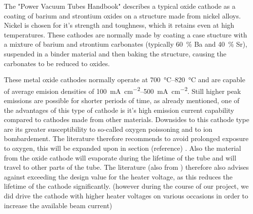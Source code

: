 The "Power Vacuum Tubes Handbook" \cite{PowerTubes323Avadhanulu} describes a typical oxide cathode as a coating of barium and strontium oxides on a structure made from nickel alloys. Nickel is chosen for it's strength and toughness, which it retains even at high temperatures. These cathodes are normally made by coating a case stucture with a mixture of barium and strontium carbonates (typically \SI{60}{\percent} Ba and \SI{40}{\percent} Sr), suspended in a binder material and then baking the structure, causing the carbonates to be reduced to oxides.

These metal oxide cathodes normally operate at \SIrange{700}{820}{\celsius} and are capable of average emision densities of \SIrange{100}{500}{\milli\ampere\per\centi\meter\squared}. Still higher peak emissions are possible for shorter periods of time, as already mentioned, one of the advantages of this type of cathode is it's high emission current capability compared to cathodes made from other materials. Downsides to this cathode type are its greater susceptibility to so-called oxygen poissoning and to ion bombardement. The literature therefore recommends to avoid prolonged exposure to oxygen, this will be expanded upon in section (reference) . Also the material from the oxide cathode will evaporate during the lifetime of the tube and will travel to other parts of the tube. The literature (also from \cite{PowerTubes323Avadhanulu}) therefore also advises against exceeding the design value  for the heater voltage, as this reduces the lifetime of the cathode significantly. (however during the course of our project, we did drive the cathode with higher heater voltages on various occasions in order to increase the available beam current)













